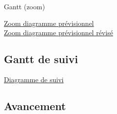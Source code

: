 \documentclass[xcolor=dvipsnames]{beamer}
\begin{document}
	\begin{frame}{Gantt (zoom)}
	
		\begin{center}
			\href{run:Images/GantInitialClasses.gif}{Zoom diagramme pr\'evisionnel}\\
			\bigskip
			\href{run:Images/GantReferenceClasses.gif}{Zoom diagramme prévisionnel révisé}
		\end{center}
	\end{frame}
	
	
	\subsection{Gantt de suivi}
	\begin{frame}{\subsecname}
		\begin{center}
			\href{run:Images/Gantt_ProjetDiscretSuivi.gif}{Diagramme de suivi}
		\end{center}
	\end{frame}


	\subsection{Avancement}
	\begin{frame}{\subsecname}
		\begin{figure}
		\end{figure}
	\end{frame}


	\begin{frame}{\subsecname}
		\begin{figure}
		\end{figure}
	\end{frame}


\end{document}
